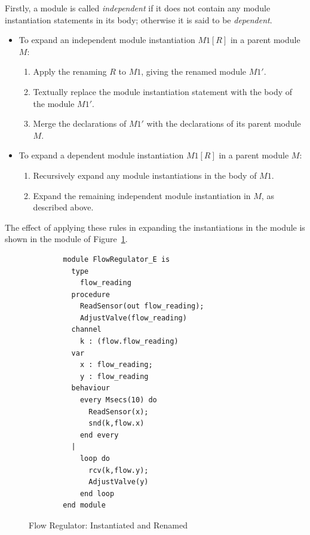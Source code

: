 Firstly, a module is called \emph{independent} if it does not contain any
module instantiation statements in its body; otherwise it is 
said to be \emph{dependent}.
 \begin{itemize}
\item
To expand an independent module instantiation $M1[R]$ in a parent module $M$:
\begin{enumerate}
\item Apply the renaming $R$ to $M1$, giving the renamed module
  $M1'$. 
\item Textually replace the module instantiation statement with the body of 
  the module $M1'$.
\item Merge the declarations of $M1'$ with the 
  declarations of its parent module $M$.
\end{enumerate}
\item
To expand a dependent module instantiation $M1[R]$ in a parent module 
$M$:
\begin{enumerate}
\item Recursively expand any module instantiations in the body of $M1$.
\item Expand the remaining independent module instantiation in $M$, as 
  described above. 
\end{enumerate}
\end{itemize}

The effect of applying these rules in expanding the instantiations in the
module  is shown in the module
 of Figure~\ref{fig:prmodinstex}.
\begin{figure}
\begin{center}
\begin{minipage}{.8\linewidth}
\small
\begin{verbatim}
        module FlowRegulator_E is
          type
            flow_reading
          procedure
            ReadSensor(out flow_reading);
            AdjustValve(flow_reading)
          channel
            k : (flow.flow_reading)
          var
            x : flow_reading;
            y : flow_reading
          behaviour 
            every Msecs(10) do
              ReadSensor(x);
              snd(k,flow.x)
            end every
          | 
            loop do
              rcv(k,flow.y);
              AdjustValve(y)
            end loop
        end module
\end{verbatim}
\end{minipage}
\end{center}
\caption{Flow Regulator: Instantiated and Renamed \label{fig:prmodinstex}}
\end{figure}
 
